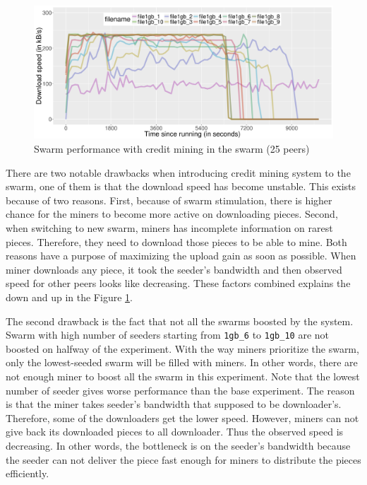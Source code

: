 \begin{figure}[h!]
	\centering
	\includegraphics[width=\textwidth]{pics/results/swperf_sc2_25.png}
	\caption{Swarm performance with credit mining in the swarm (25 peers)}
	\label{fig:swarmcm25perf}
\end{figure}

There are two notable drawbacks when introducing credit mining system to the swarm, one of them is that the download speed has become unstable. This exists because of two reasons. First, because of swarm stimulation, there is higher chance for the miners to become more active on downloading pieces. Second, when switching to new swarm, miners has incomplete information on rarest pieces. Therefore, they need to download those pieces to be able to mine. Both reasons have a purpose of maximizing the upload gain as soon as possible. When miner downloads any piece, it took the seeder's bandwidth and then observed speed for other peers looks like decreasing. These factors combined explains the down and up in the Figure \ref{fig:swarmcm25perf}.

The second drawback is the fact that not all the swarms boosted by the system. Swarm with high number of seeders starting from \texttt{1gb\_6} to \texttt{1gb\_10} are not boosted on halfway of the experiment. With the way miners prioritize the swarm, only the lowest-seeded swarm will be filled with miners. In other words, there are not enough miner to boost all the swarm in this experiment. Note that the lowest number of seeder gives worse performance than the base experiment. The reason is that the miner takes seeder's bandwidth that supposed to be downloader's. Therefore, some of the downloaders get the lower speed. However, miners can not give back its downloaded pieces to all downloader. Thus the observed speed is decreasing. In other words, the bottleneck is on the seeder's bandwidth because the seeder can not deliver the piece fast enough for miners to distribute the pieces efficiently.

